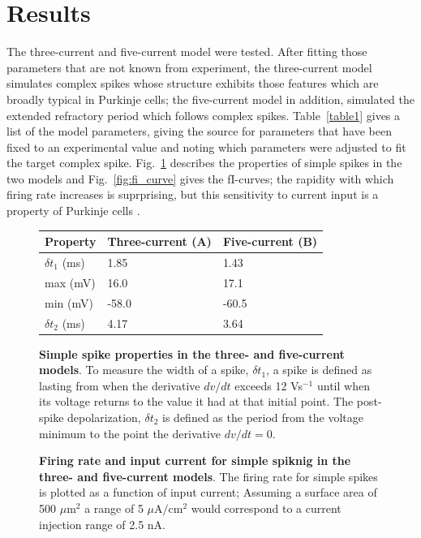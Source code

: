 \documentclass[twocolumn]{svjour3}          %
\begin{document}
\section{Results}

The three-current and five-current model were tested. After fitting
those parameters that are not known from experiment, the three-current
model simulates complex spikes whose structure exhibits those features
which are broadly typical in Purkinje cells; the five-current model in
addition, simulated the extended refractory period which follows
complex spikes. Table~\ref{table1} gives a list of the model
parameters, giving the source for parameters that have been fixed to
an experimental value and noting which parameters were adjusted to fit
the target complex spike. Fig.~\ref{fig:spike_properties} describes
the properties of simple spikes in the two models and
Fig.~\ref{fig:fi_curve} gives the fI-curves; the rapidity with which
firing rate increases is suprprising, but this sensitivity to current
input is a property of Purkinje cells \cite{DeSchutterBower1994a}.

\begin{figure}[!ht]
  
  \caption{\textbf{Simple spike properties in the three- and
      five-current models}. To measure the width of a spike, $\delta
    t_1$, a spike is defined as lasting from when the derivative
    $dv/dt$ exceeds 12 Vs$^{-1}$ until when its voltage returns to the
    value it had at that initial point. The post-spike depolarization,
    $\delta t_2$ is defined as the period from the voltage minimum
    to the point the derivative $dv/dt=0$.\label{fig:spike_properties}}
  \begin{center}
    \begin{tabular}{|l l l|}
      \hline
      Property & Three-current (\textbf{A}) & Five-current (\textbf{B})\\ \hline
      $\delta t_1$ (ms)& 1.85&1.43\\
      max (mV)&16.0&17.1\\
      min (mV)&-58.0 &-60.5\\
      $\delta t_2$ (ms)&4.17&3.64\\
      \hline
    \end{tabular}
    \end{center}
\end{figure}


\begin{figure}[!ht]
  
  \caption{\textbf{Firing rate and input current for simple spiknig in
      the three- and five-current models}. The firing rate for simple
    spikes is plotted as a function of input current; Assuming a
    surface area of 500 $\mu$m$^2$ a range of 5 $\mu$A$/$cm$^2$ would
    correspond to a current injection range of 2.5
    nA.\label{fig:fi_curves}}

\end{figure}
\end{document}
